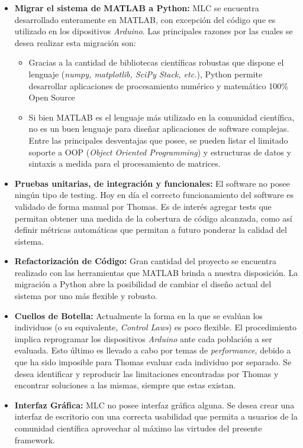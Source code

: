 \documentclass[a4paper,10pt]{article}
\begin{document}
        \begin{itemize}
            \item \textbf{Migrar el sistema de MATLAB a Python:} MLC se encuentra desarrollado enteramente en MATLAB, con excepción del
            código que es utilizado en los dipositivos \textit{Arduino}. Las principales razones por las cuales se desea realizar esta
            migración son:
            \begin{itemize}
                \item Gracias a la cantidad de bibliotecas científicas robustas que dispone el lenguaje (\textit{numpy, matplotlib,
                SciPy Stack, etc.}), Python permite desarrollar aplicaciones de procesamiento numérico y matemático 100\% Open
                Source
                \item Si bien MATLAB es el lenguaje más utilizado en la comunidad científica, no es un buen
                lenguaje para diseñar aplicaciones de software complejas. Entre las principales desventajas que posee, se pueden listar
                el limitado soporte a OOP (\textit{Object Oriented Programming}) y estructuras de datos y sintaxis a medida para el
                procesamiento de matrices.
            \end{itemize}

            \item \textbf{Pruebas unitarias, de integración y funcionales:} El software no posee ningún tipo de testing. Hoy en día el
            correcto funcionamiento del software es validado de forma manual por Thomas. Es de interés agregar tests que permitan obtener
            una medida de la cobertura de código alcanzada, como así definir métricas
            automáticas que permitan a futuro ponderar la calidad del sistema.
            \item \textbf{Refactorización de Código:} Gran cantidad del proyecto se encuentra realizado con las herramientas que MATLAB
            brinda a nuestra disposición. La migración a Python abre la posibilidad de cambiar el diseño actual del sistema por uno más
            flexible y robusto.
            \item \textbf{Cuellos de Botella:} Actualmente la forma en la que se evalúan los individuos (o su equivalente, \textit{Control Laws})
            es poco flexible. El procedimiento implica reprogramar los dispositivos \textit{Arduino} ante cada población a ser evaluada.
            Esto último es llevado a cabo por temas de \textit{performance}, debido a que ha sido imposible para Thomas evaluar cada
            individuo por separado. Se desea identificar y reproducir las limitaciones encontradas por Thomas y encontrar soluciones a
            las mismas, siempre que estas existan.
            \item \textbf{Interfaz Gráfica:} MLC no posee interfaz gráfica alguna. Se desea crear una interfaz de escritorio
            con una correcta usabilidad que permita a usuarios de la comunidad científica aprovechar al máximo las virtudes del presente
            framework.
        \end{itemize}
\end{document}
